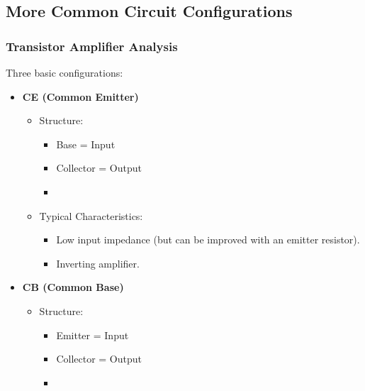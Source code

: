 \subsection{More Common Circuit Configurations}%
\label{sub:more-common-circuit-configurations}

\subsubsection{Transistor Amplifier Analysis}

\begin{multicols}{2}
    \begin{CheatsheetEntryFrame}


        Three basic configurations:
        \begin{itemize}
            \item \textbf{CE (Common Emitter)}
            \begin{itemize}
                \item Structure:
                \begin{itemize}
                    \item Base = Input
                    \item Collector = Output
                    \item {}
                \end{itemize}
                \item Typical Characteristics:
                \begin{itemize}
                    \item Low input impedance (but can be improved with an emitter resistor).
                    \item Inverting amplifier.
                \end{itemize}
            \end{itemize}
            \item \textbf{CB (Common Base)}
            \begin{itemize}
                \item Structure:
                \begin{itemize}
                    \item Emitter = Input
                    \item Collector = Output
                    \item {}

\end{itemize}
\end{itemize}
\end{itemize}
\end{CheatsheetEntryFrame}
\end{multicols}
